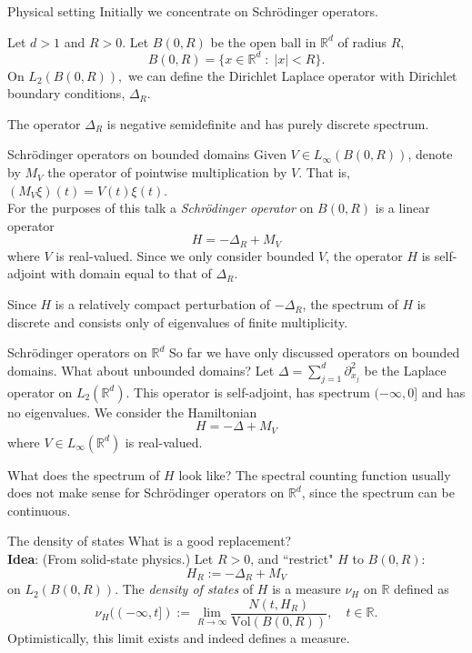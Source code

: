 \documentclass{beamer}
\numberwithin{equation}{section}
\theoremstyle{plain}
\theoremstyle{plain}
\theoremstyle{definition}
\theoremstyle{plain}
\theoremstyle{plain}
\theoremstyle{definition}
\newcommand{\Rl}{\mathbb{R}}
\begin{document}
\begin{frame}{Physical setting}
    Initially we concentrate on Schr\"odinger operators.

    Let $d > 1$ and $R > 0$. Let $B(0,R)$ be the open ball in $\Rl^d$ of radius $R,$
    \begin{equation*}
        B(0,R) = \{x\in \Rl^d\;:\;|x|<R\}.
    \end{equation*}
    \pause
    On $L_2(B(0,R)),$ we can define the Dirichlet Laplace operator with Dirichlet boundary conditions, $\Delta_R.$
    \pause
    
    The operator $\Delta_R$ is negative semidefinite and has purely discrete spectrum.
\end{frame}

\begin{frame}{Schr\"odinger operators on bounded domains}
    Given $V \in L_\infty(B(0,R))$, denote by $M_V$ the operator of pointwise multiplication by $V$. That is, $(M_V\xi)(t) = V(t)\xi(t)$. \pause \\
    For the purposes of this talk a \emph{Schr\"odinger operator} on $B(0,R)$ is a linear operator
    $$
        H = -\Delta_R+M_V
    $$
    where $V$ is real-valued. Since we only consider bounded $V$, the operator $H$ is self-adjoint with domain equal to that of $\Delta_R$.\pause
    
    Since $H$ is a relatively compact
    perturbation of $-\Delta_R$, the spectrum of $H$ is discrete and consists only of eigenvalues of finite multiplicity. 
\end{frame}

\begin{frame}{Schr\"odinger operators on $\Rl^d$}
    So far we have only discussed operators on bounded domains. What about unbounded domains?
    Let $\Delta = \sum_{j=1}^d \partial_{x_j}^2$ be the Laplace operator on $L_2(\Rl^d)$. This operator is self-adjoint,
    has spectrum $(-\infty,0]$ and has no eigenvalues. \pause We consider the Hamiltonian 
    $$
        H = -\Delta+M_V
    $$
    where $V \in L_\infty(\Rl^d)$ is real-valued.
    
    What does the spectrum of $H$ look like?  \pause
    The spectral counting function usually does not make sense for Schr\"odinger operators on $\Rl^d$, since the spectrum can be continuous.
\end{frame}

\begin{frame}{The density of states}
    What is a good replacement?\\
    \pause
    {\bf Idea}: (From solid-state physics.) Let $R > 0$, and ``restrict" $H$ to $B(0,R)$:
    \[
        H_R := -\Delta_R + M_{V}
    \]
    on $L_2(B(0,R))$. The \emph{density of states} of $H$ is a measure $\nu_H$ on $\Rl$ defined as
    \[
        \nu_H((-\infty,t]) := \lim_{R\to \infty} \frac{N(t,H_R)}{\mathrm{Vol}(B(0,R))},\quad t \in \Rl.
    \] 
    Optimistically, this limit exists and indeed defines a measure. 
\end{frame}
\end{document}
